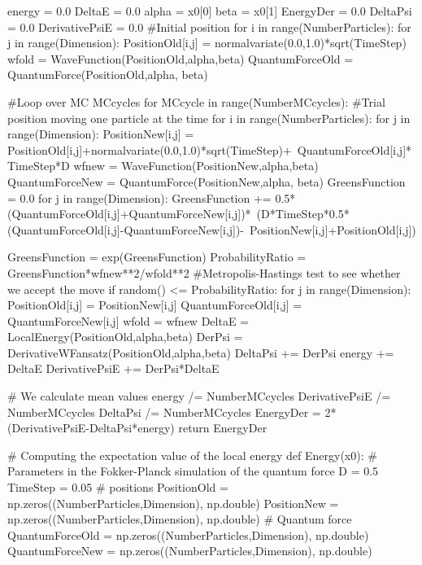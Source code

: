 \documentclass[%
oneside,                 %
final,                   %
10pt]{article}
\begin{document}
    energy = 0.0
    DeltaE = 0.0
    alpha = x0[0]
    beta = x0[1]
    EnergyDer = 0.0
    DeltaPsi = 0.0
    DerivativePsiE = 0.0 
    #Initial position
    for i in range(NumberParticles):
        for j in range(Dimension):
            PositionOld[i,j] = normalvariate(0.0,1.0)*sqrt(TimeStep)
    wfold = WaveFunction(PositionOld,alpha,beta)
    QuantumForceOld = QuantumForce(PositionOld,alpha, beta)

    #Loop over MC MCcycles
    for MCcycle in range(NumberMCcycles):
        #Trial position moving one particle at the time
        for i in range(NumberParticles):
            for j in range(Dimension):
                PositionNew[i,j] = PositionOld[i,j]+normalvariate(0.0,1.0)*sqrt(TimeStep)+\
                                       QuantumForceOld[i,j]*TimeStep*D
            wfnew = WaveFunction(PositionNew,alpha,beta)
            QuantumForceNew = QuantumForce(PositionNew,alpha, beta)
            GreensFunction = 0.0
            for j in range(Dimension):
                GreensFunction += 0.5*(QuantumForceOld[i,j]+QuantumForceNew[i,j])*\
	                              (D*TimeStep*0.5*(QuantumForceOld[i,j]-QuantumForceNew[i,j])-\
                                      PositionNew[i,j]+PositionOld[i,j])
      
            GreensFunction = exp(GreensFunction)
            ProbabilityRatio = GreensFunction*wfnew**2/wfold**2
            #Metropolis-Hastings test to see whether we accept the move
            if random() <= ProbabilityRatio:
                for j in range(Dimension):
                    PositionOld[i,j] = PositionNew[i,j]
                    QuantumForceOld[i,j] = QuantumForceNew[i,j]
                wfold = wfnew
        DeltaE = LocalEnergy(PositionOld,alpha,beta)
        DerPsi = DerivativeWFansatz(PositionOld,alpha,beta)
        DeltaPsi += DerPsi
        energy += DeltaE
        DerivativePsiE += DerPsi*DeltaE
            
    # We calculate mean values
    energy /= NumberMCcycles
    DerivativePsiE /= NumberMCcycles
    DeltaPsi /= NumberMCcycles
    EnergyDer  = 2*(DerivativePsiE-DeltaPsi*energy)
    return EnergyDer


# Computing the expectation value of the local energy 
def Energy(x0):
    # Parameters in the Fokker-Planck simulation of the quantum force
    D = 0.5
    TimeStep = 0.05
    # positions
    PositionOld = np.zeros((NumberParticles,Dimension), np.double)
    PositionNew = np.zeros((NumberParticles,Dimension), np.double)
    # Quantum force
    QuantumForceOld = np.zeros((NumberParticles,Dimension), np.double)
    QuantumForceNew = np.zeros((NumberParticles,Dimension), np.double)
\end{document}
